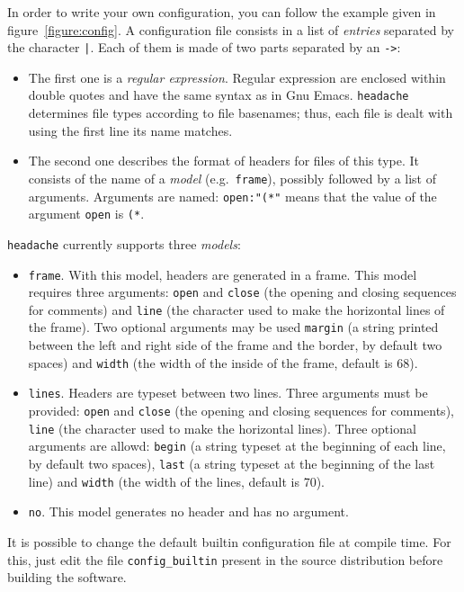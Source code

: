 \documentclass{article}
\newcommand{\headache}{\texttt{headache}}
\begin{document}
In order to write your own configuration, you can follow the example
given in figure~\ref{figure:config}.  A configuration file consists in
a list of \emph{entries} separated by the character \verb+|+.  Each
of them is made of two parts separated by an \verb+->+:
\begin{itemize}
\item The first one is a \emph{regular expression}.  Regular
  expression are enclosed within double quotes and have the same
  syntax as in Gnu Emacs.  \headache{} determines file types according to
  file basenames; thus, each file is dealt with using the first line
  its name matches.
\item The second one describes the format of headers for files of this
  type.  It consists of the name of a \emph{model} (e.g.\ 
  \verb+frame+), possibly followed by a list of arguments.  Arguments
  are named: \verb+open:"(*"+ means that the value of the argument
  \verb+open+ is \verb+(*+.
\end{itemize}
\headache{} currently supports three \emph{models}:
\begin{itemize}
\item \verb+frame+.  With this model, headers are generated in a
  frame.  This model requires three arguments: \verb+open+ and
  \verb+close+ (the opening and closing sequences for comments) and
  \verb+line+ (the character used to make the horizontal lines of the
  frame).  Two optional arguments may be used \verb+margin+ (a string
  printed between the left and right side of the frame and the border,
  by default two spaces) and \verb+width+ (the width of the inside of
  the frame, default is 68).
\item \verb+lines+.  Headers are typeset between two lines.  Three
  arguments must be provided: \verb+open+ and \verb+close+ (the
  opening and closing sequences for comments), \verb+line+ (the
  character used to make the horizontal lines).  Three optional
  arguments are allowd: \verb+begin+ (a string typeset at the
  beginning of each line, by default two spaces), \verb+last+ (a
  string typeset at the beginning of the last line) and \verb+width+
  (the width of the lines, default is 70).
\item \verb+no+.  This model generates no header and has no argument.
\end{itemize}

It is possible to change the default builtin configuration file at
compile time.  For this, just edit the file \verb+config_builtin+
present in the source distribution before building the software.
\end{document}
